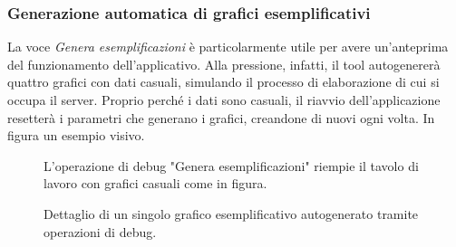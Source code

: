 \newpage

\subsubsection{Generazione automatica di grafici esemplificativi}

La voce \textit{Genera esemplificazioni} è particolarmente utile per avere un'anteprima del funzionamento dell'applicativo. Alla pressione, infatti, il tool autogenererà quattro grafici con dati casuali, simulando il processo di elaborazione di cui si occupa il server. Proprio perché i dati sono casuali, il riavvio dell'applicazione resetterà i parametri che generano i grafici, creandone di nuovi ogni volta. In figura un esempio visivo.

\begin{figure}[ht!]
    \centering
    \caption{L'operazione di debug "Genera esemplificazioni" riempie il tavolo di lavoro con grafici casuali come in figura.}
    \label{fig:esempio}
\end{figure}

\begin{figure}[ht!]
    \centering
    \caption{Dettaglio di un singolo grafico esemplificativo autogenerato tramite operazioni di debug.}
    \label{fig:esempio}
\end{figure}

